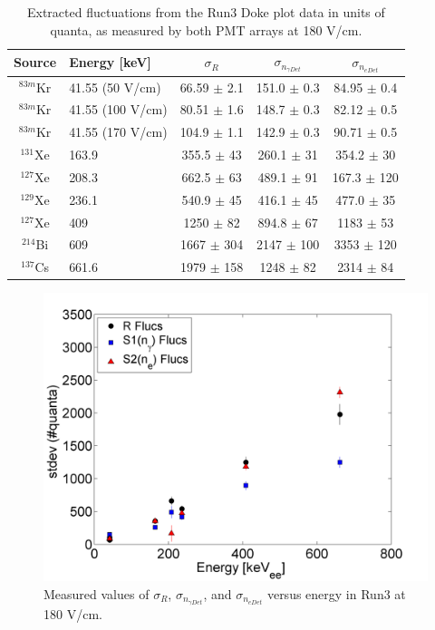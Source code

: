 \begin{center}
\begin{table}[H]
\begin{tabular}{ | c | p{40mm} | c | c | c | }
\hline
Source & Energy [keV] & $\sigma_{R}$ & $\sigma_{n_{\gamma Det}}$ & $\sigma_{n_{e Det}}$ \\ \hline
$^{83m}$Kr & 41.55 (50 V/cm) & 66.59 $\pm$ 2.1 & 151.0 $\pm$ 0.3 & 84.95 $\pm$ 0.4\\  \hline
$^{83m}$Kr & 41.55 (100 V/cm) & 80.51 $\pm$ 1.6 & 148.7 $\pm$ 0.3 & 82.12 $\pm$ 0.5\\  \hline
$^{83m}$Kr & 41.55 (170 V/cm) & 104.9 $\pm$ 1.1 & 142.9 $\pm$ 0.3 & 90.71 $\pm$ 0.5\\  \hline
$^{131}$Xe & 163.9 & 355.5 $\pm$ 43 & 260.1 $\pm$ 31 & 354.2 $\pm$ 30\\  \hline
$^{127}$Xe & 208.3 & 662.5 $\pm$ 63 & 489.1 $\pm$ 91 & 167.3 $\pm$ 120\\  \hline
$^{129}$Xe & 236.1 & 540.9 $\pm$ 45 & 416.1 $\pm$ 45 & 477.0 $\pm$ 35\\  \hline
$^{127}$Xe & 409 & 1250  $\pm$ 82 & 894.8 $\pm$ 67 & 1183 $\pm$ 53\\  \hline
$^{214}$Bi & 609 & 1667 $\pm$ 304 & 2147 $\pm$ 100 & 3353 $\pm$ 120\\  \hline
$^{137}$Cs & 661.6 & 1979 $\pm$ 158 & 1248 $\pm$ 82 & 2314 $\pm$ 84\\ 
\hline
\end{tabular}
\caption{Extracted fluctuations from the Run3 Doke plot data in units of quanta, as measured by both PMT arrays at 180 V/cm.}
\label{SigR}
\end{table}
\end{center}


\begin{figure}[H]
\centering
\includegraphics[scale=0.5]{EnergyFluctuations.png}
\caption{Measured values of $\sigma_{R}$, $\sigma_{n_{\gamma Det}}$, and $\sigma_{n_{e Det}}$ versus energy in Run3 at 180 V/cm.}
\label{EnergyFluc}
\end{figure}


